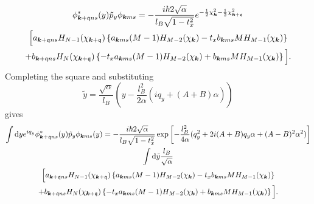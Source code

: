 \begin{multline}
  \phi ^{*} _{\bm{k} + \mathfrak{q} ns} (y) \tilde{p}_{y} \phi _{\bm{k} m s}
  = -\frac{i\hbar 2 \sqrt{\alpha } }{l_{B} \sqrt{1 - t_{x}^2} }
  e^{-\frac{1}{2} \chi _{\bm{k}}^2 - \frac{1}{2} \chi _{\bm{k} + \mathfrak{q}} ^2}\\
  \Big[
  a_{\bm{k} + \mathfrak{q} ns} H_{N-1}(\chi_{\bm{k}+\mathfrak{q}})
  \left\{a_{\bm{k} ms} (M-1) H_{M-2} (\chi_{\bm{k}}) - t_{x} b_{\bm{k} ms} M H_{M-1} (\chi_{\bm{k}})\right\}\\
  +
  b_{\bm{k} + \mathfrak{q} ns} H_{N} (\chi_{\bm{k} + \mathfrak{q}})
  \left\{-t_{x} a_{\bm{k} ms} (M-1) H_{M-2} (\chi_{\bm{k}}) + b_{\bm{k} ms} M H_{M-1} (\chi_{\bm{k}})\right\}
  \Big].
\end{multline}
Completing the square and substituting
\[
  \tilde{y} = \frac{\sqrt{ \alpha  }}{l_{B}}
  \left(y - \frac{l_{B}^2}{2 \alpha } (i q_{y} + (A + B) \alpha) \right)
\]
gives
\begin{multline}
  \int \mathrm{d}y
  e^{i q_{y}}
  \phi ^{*}_{\bm{k} + \mathfrak{q} ns}(y) \tilde{p}_{y}
  \phi_{\bm{k} ms} (y)
  =
  - \frac{i\hbar 2 \sqrt{\alpha} }{l_{B} \sqrt{1 - t_{x}^2} }
  \exp
  \left[
    - \frac{l_{B}^2}{4 \alpha } (q_{y}^2 + 2 i (A+B) q_{y} \alpha + (A-B)^2\alpha^2)
  \right  ]\\
  \int \mathrm{d} \tilde{y} \frac{l_{B}}{\sqrt{\alpha } }\\
  \Big[
  a_{\bm{k} + \mathfrak{q} ns} H_{N-1}( \chi _{\bm{k} + \mathfrak{q}} )
  \left\{
    a_{\bm{k} ms} (M-1) H_{M-2} ( \chi _{\bm{k}} )
    - t_{x} b_{\bm{k} ms} M H_{M-1} ( \chi _{\bm{k}} ) \right\}\\
  +
  b_{\bm{k} + \mathfrak{q} ns} H_{N} ( \chi _{\bm{k} + \mathfrak{q}} )
  \left\{
    -t_{x} a_{\bm{k} ms} (M-1) H_{M-2} ( \chi _{\bm{k}} )
    + b_{\bm{k} ms} M H_{M-1} ( \chi _{\bm{k}} )
  \right\}
  \Big].
\end{multline}

